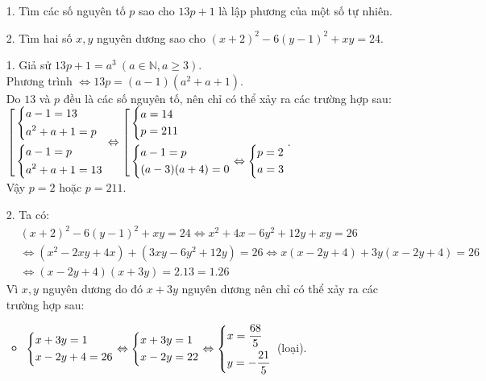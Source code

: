 \begin{ex}%
\hfill
    \begin{enumerate}
        \item[1.] Tìm các số nguyên tố $p$ sao cho $13p+1$ là lập phương của một số tự nhiên.
        \item[2.] Tìm hai số $x,y$ nguyên dương sao cho $\left(x+2\right)^2-6\left(y-1\right)^2+xy=24$.
    \end{enumerate}
\loigiai
    {
    \begin{enumerate}
    \item[1.] Giả sử $13p+1=a^3\ (a\in\mathbb{N}, a\ge 3)$.\\
    Phương trình $\Leftrightarrow 13p=\left(a-1\right)\left(a^2+a+1\right)$.\\
    Do $13$ và $p$ đều là các số nguyên tố, nên chỉ có thể xảy ra các trường hợp sau:\\
    $\left[\begin{aligned}&\left\{\begin{aligned}&a-1=13\\&a^2+a+1=p\end{aligned}\right.\\&\left\{\begin{aligned}&a-1=p\\&a^2+a+1=13\end{aligned}\right.\end{aligned}\right.\Leftrightarrow \left[\begin{aligned}&\left\{\begin{aligned}&a=14\\&p=211\end{aligned}\right.\\&\left\{\begin{aligned}&a-1=p\\&(a-3)(a+4)=0\end{aligned}\right.\Leftrightarrow \left\{\begin{aligned}&p=2\\&a=3\end{aligned}\right.\end{aligned}\right.$.\\
    Vậy $p=2$ hoặc $p=211$.
    \item[2.] Ta có:\\ 
    $
        \begin{aligned}
        &\left(x+2\right)^2-6\left(y-1\right)^2+xy=24\Leftrightarrow x^2+4x-6y^2+12y+xy=26\\
        &\Leftrightarrow \left(x^2-2xy+4x\right)+\left(3xy-6y^2+12y\right)=26\Leftrightarrow x\left(x-2y+4\right)+3y\left(x-2y+4\right)=26\\
        &\Leftrightarrow \left(x-2y+4\right)\left(x+3y\right)=2.13=1.26
        \end{aligned}
       $\\
       Vì $x,y$ nguyên dương do đó $x+3y$ nguyên dương nên chỉ có thể xảy ra các trường hợp sau:
       \begin{itemize}
       \item $\left\{\begin{aligned}&x+3y=1\\&x-2y+4=26\end{aligned}\right.\Leftrightarrow \left\{\begin{aligned}&x+3y=1\\&x-2y=22\end{aligned}\right.\Leftrightarrow \left\{\begin{aligned}&x=\dfrac{68}{5}\\&y=-\dfrac{21}{5}\end{aligned}\right.$ (loại).

\end{itemize}
\end{enumerate}}
\end{ex}
